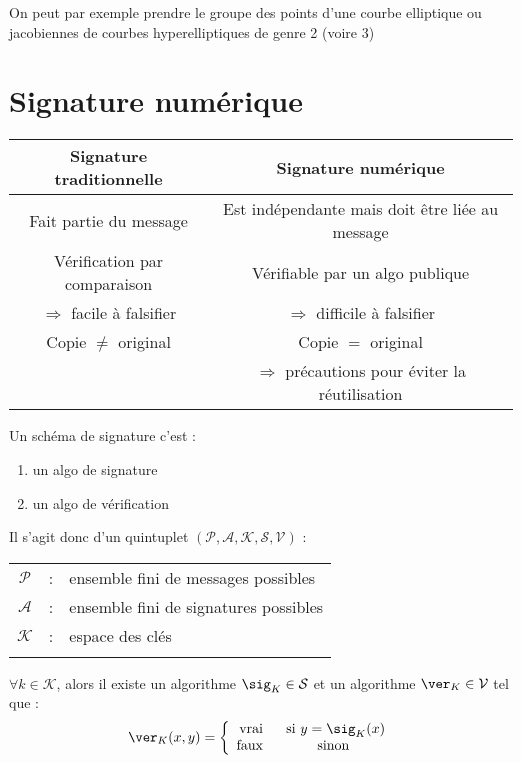 \documentclass[a4paper, 10pt]{thesis}
\begin{document}
\begin{ex}
    On peut par exemple prendre le groupe des points d'une courbe elliptique ou jacobiennes de
    courbes hyperelliptiques de genre 2 (voire 3)
\end{ex}

\section{Signature numérique}

\begin{tabular}{c|c} 
    Signature traditionnelle & Signature numérique \\ \hline
    Fait partie du message & Est indépendante mais doit être liée au message \\
    Vérification par comparaison & Vérifiable par un algo publique \\
    $\Rightarrow$ facile à falsifier & $\Rightarrow$ difficile à falsifier \\
    Copie $\neq$ original & Copie $=$ original \\
                          & $\Rightarrow$ précautions pour éviter la réutilisation \\
\end{tabular}

Un schéma de signature c'est :
\begin{enumerate}
    \item un algo de signature
    \item un algo de vérification
\end{enumerate}

Il s'agit donc d'un quintuplet $(\mathcal{P}, \mathcal{A}, \mathcal{K}, \mathcal{S}, \mathcal{V})$ :
\\


\begin{tabular}{ccl}
    $\mathcal{P}$ & : & ensemble fini de messages possibles \\
    $\mathcal{A}$ & : & ensemble fini de signatures possibles \\
    $\mathcal{K}$ & : & espace des clés \\ \\
\end{tabular}

$\forall k \in \mathcal{K}$, alors il existe un algorithme $\sig_K \in \mathcal{S}$ et un algorithme
$\ver_K \in \mathcal{V}$ tel que :
\begin{displaymath}
    \ver_K(x, y) = \left \lbrace
    \begin{array}{rc}
        \mbox{vrai } & \mbox{ si } y = \sig_K(x) \\
        \mbox{faux } & \mbox{ sinon }
    \end{array}
    \right .
\end{displaymath}
\end{document}
